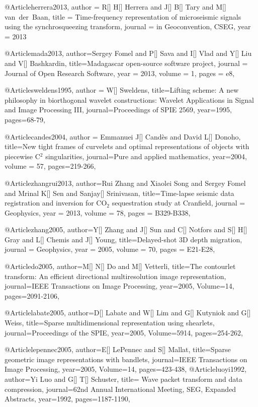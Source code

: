 @Article{herrera2013,
  author = 	 {R[] H[] Herrera and J[] B[] Tary and M[] van~der~Baan},
  title = 	 {Time-frequency representation of microseismic signals using the synchrosqueezing transform},
  journal = 	 {in Geoconvention, CSEG},
  year = 	 2013
}

@Article{mada2013,
  author={Sergey Fomel and P[] Sava and I[] Vlad and Y[] Liu and V[] Bashkardin},
  title={Madagascar open-source software project},
  journal = 	 {Journal of Open Research Software},
  year = 	 2013,
  volume =	 1,
  pages =	 {e8},
}

@Article{sweldens1995,
  author = {W[] Sweldens},
  title={Lifting scheme: A new philosophy in biorthogonal wavelet constructions: Wavelet Applications in Signal and Image Processing III},
  journal={Proceedings of SPIE 2569},
  year=1995,
  pages={68-79},
}

@Article{candes2004,
  author = {Emmanuei J[] Cand\`{e}s and David L[] Donoho},
  title={New tight frames of curvelets and optimal representations of objects with piecewise {C}$^2$ singularities},
  journal={Pure and applied mathematics},
  year=2004,
  volume =	 57,
  pages={219-266},
}


@Article{zhangrui2013,
  author={Rui Zhang and Xiaolei Song and Sergey Fomel and Mrinal K[] Sen and Sanjay[] Srinivasan},
  title={Time-lapse seismic data registration and inversion for {CO}$_2$ sequestration study at Cranfield},
  journal = 	 {Geophysics},
  year = 	 2013,
  volume =	 78,
  pages =	 {B329-B338},
}

@Article{zhang2005,
  author={Y[] Zhang and J[] Sun and C[] Notfors and S[] H[] Gray and L[] Chemis and J[] Young},
  title={Delayed-shot 3{D} depth migration},
  journal = 	 {Geophysics},
  year = 	 2005,
  volume =	 70,
  pages =	 {E21-E28},
}

@Article{do2005,
  author={M[] N[] Do and M[] Vetterli},
  title={The contourlet transform: An efficient directional multiresolution image representation},
  journal={IEEE Transactions on Image Processing},
  year=2005,
  Volume=14,
  pages={2091-2106},
}

@Article{labate2005,
  author={D[] Labate and W[] Lim and G[] Kutyniok and G[] Weiss},
  title={Sparse multidimensional representation using shearlets},
  journal={Proceedings of the SPIE},
  year=2005,
  Volume=5914,
  pages={254-262},
}

@Article{lepennec2005,
  author={E[] LePennec and S[] Mallat},
  title={Sparse geometric image representations with bandlets},
  journal={IEEE Transactions on Image Processing},
  year=2005,
  Volume=14,
  pages={423-438},
}
@Article{luoyi1992,
  author={Yi Luo and G[] T[] Schuster},
  title={	Wave packet transform and data compression},
  journal={62nd Annual International Meeting, SEG, Expanded Abstracts},
  year=1992,
  pages={1187-1190},
}


